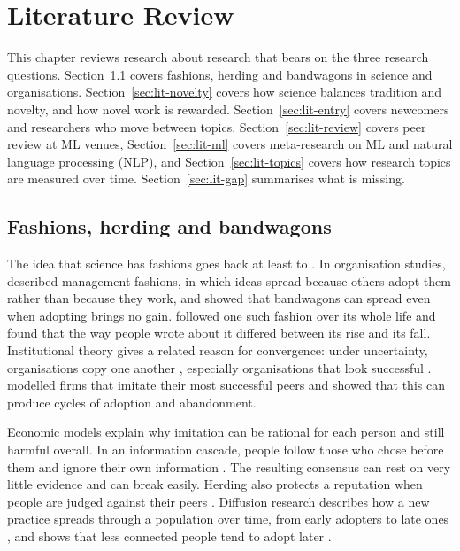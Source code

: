 \chapter{Literature Review}
\label{sec:litreview}

This chapter reviews research about research that bears on the three research questions. Section~\ref{sec:lit-fashion}
covers fashions, herding and bandwagons in science and organisations. Section~\ref{sec:lit-novelty} covers how science
balances tradition and novelty, and how novel work is rewarded. Section~\ref{sec:lit-entry} covers newcomers and
researchers who move between topics. Section~\ref{sec:lit-review} covers peer review at ML venues,
Section~\ref{sec:lit-ml} covers meta-research on ML and natural language processing (NLP), and
Section~\ref{sec:lit-topics} covers how research topics are measured over time. Section~\ref{sec:lit-gap} summarises
what is missing.

\section{Fashions, herding and bandwagons}
\label{sec:lit-fashion}

The idea that science has fashions goes back at least to \citet{crane1969fashion}. In organisation studies,
\citet{abrahamson1991managerial} described management fashions, in which ideas spread because others adopt them rather
than because they work, and \citet{abrahamson1993institutional} showed that bandwagons can spread even when adopting
brings no gain. \citet{abrahamson1999management} followed one such fashion over its whole life and found that the way
people wrote about it differed between its rise and its fall. Institutional theory gives a related reason for
convergence: under uncertainty, organisations copy one another \citep{dimaggio1983iron}, especially organisations that
look successful \citep{haunschild1997modes}. \citet{strang2001search} modelled firms that imitate their most
successful peers and showed that this can produce cycles of adoption and abandonment.

Economic models explain why imitation can be rational for each person and still harmful overall. In an information
cascade, people follow those who chose before them and ignore their own information
\citep{bikhchandani1992theory,banerjee1992simple}. The resulting consensus can rest on very little evidence and can
break easily. Herding also protects a reputation when people are judged against their peers
\citep{scharfstein1990herd}. Diffusion research describes how a new practice spreads through a population over time,
from early adopters to late ones \citep{rogers2003diffusion}, and shows that less connected people tend to adopt later
\citep{coleman1957diffusion}.

